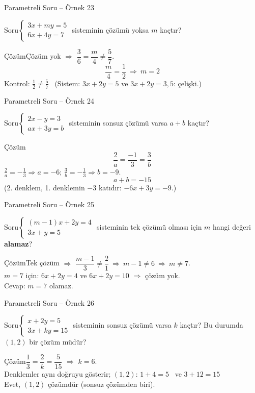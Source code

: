 \documentclass[aspectratio=169,11pt,handout]{beamer}
\newcommand{\soru}[3]{%
\begin{frame}{#1}
  \begin{block}{Soru}\large #2\end{block}
  \pause
  \begin{exampleblock}{Çözüm}\large #3\end{exampleblock}
\end{frame}}
\begin{document}
\soru{Parametreli Soru -- Örnek 23}
{\(\begin{cases}3x+my=5\\ 6x+4y=7\end{cases}\) \quad sisteminin çözümü yoksa \(m\) kaçtır?}
{Çözüm yok \(\Rightarrow\) \(\dfrac{3}{6}=\dfrac{m}{4}\neq\dfrac{5}{7}\).
\[\frac{m}{4}=\frac12\ \Rightarrow\ m=2\]
Kontrol: \(\frac12\neq\frac57\) \checkmark \ (Sistem: \(3x+2y=5\) ve \(3x+2y=3{,}5\): çelişki.)}

\soru{Parametreli Soru -- Örnek 24}
{\(\begin{cases}2x-y=3\\ ax+3y=b\end{cases}\) \quad sisteminin sonsuz çözümü varsa \(a+b\) kaçtır?}
{\[\frac{2}{a}=\frac{-1}{3}=\frac{3}{b}\]
\(\frac{2}{a}=-\frac13\Rightarrow a=-6\); \quad \(\frac{3}{b}=-\frac13\Rightarrow b=-9\).
\[a+b=-15\]
(2. denklem, 1. denklemin \(-3\) katıdır: \(-6x+3y=-9\).)}

\soru{Parametreli Soru -- Örnek 25}
{\(\begin{cases}(m-1)x+2y=4\\ 3x+y=5\end{cases}\) \quad sisteminin tek çözümü olması için \(m\) hangi değeri \textbf{alamaz}?}
{Tek çözüm \(\Rightarrow\) \(\dfrac{m-1}{3}\neq\dfrac{2}{1}\ \Rightarrow\ m-1\neq 6\ \Rightarrow\ m\neq 7\).\\[3pt]
\(m=7\) için: \(6x+2y=4\) ve \(6x+2y=10\) \(\Rightarrow\) çözüm yok.\\[3pt]
Cevap: \(m=7\) olamaz.}

\soru{Parametreli Soru -- Örnek 26}
{\(\begin{cases}x+2y=5\\ 3x+ky=15\end{cases}\) \quad sisteminin sonsuz çözümü varsa \(k\) kaçtır? Bu durumda \((1,2)\) bir çözüm müdür?}
{\(\dfrac13=\dfrac{2}{k}=\dfrac{5}{15}\) \(\Rightarrow\) \(k=6\).\\[3pt]
Denklemler aynı doğruyu gösterir; \((1,2)\): \(1+4=5\) \checkmark \ ve \(3+12=15\) \checkmark\\[3pt]
Evet, \((1,2)\) çözümdür (sonsuz çözümden biri).}
\end{document}
